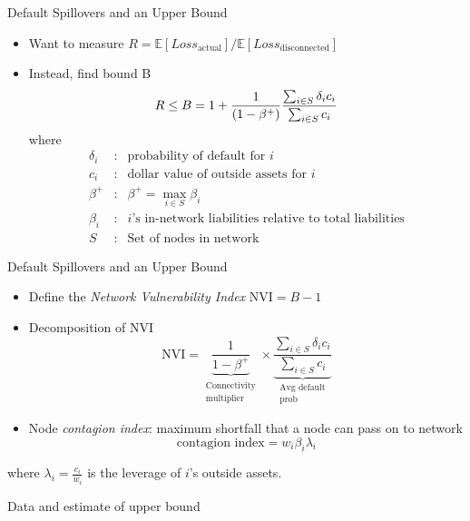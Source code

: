 \documentclass[12pt,envcountsect, leqno,xcolor=dvipsnames]{beamer}
\newcommand{\bi}{\begin{itemize}}
\newcommand{\ei}{\end{itemize}}
\begin{document}
\begin{frame}{Default Spillovers and an Upper Bound} 

\bi
\item Want to measure $R=\mathbb{E}[Loss_{\text{actual}}] / \mathbb{E}[Loss_\text{disconnected}]$
\item Instead, find bound B
	\[
	R \leq B=1+\frac{1}{(1-\beta ^{+})} \frac{\sum_{i \in S} {\delta _{i}c_{i}}}{\sum_{i \in S}{c_{i}}}\vspace{-0.1in}
	\]
where\vspace{-0.1in}
\begin{eqnarray*}
\delta _{i} &:&\text{probability of default for }i\\
c_{i} &:&\text{dollar value of outside assets for }i\\
\beta ^{+} &:& \beta^{+}=\max_{i \in S}\beta _{i} \\
\beta_i &:&i\text{'s in-network liabilities relative to total liabilities}\\
S &:&\text{Set of nodes in network}
\end{eqnarray*}%

\ei

\end{frame}


\begin{frame}{Default Spillovers and an Upper Bound} 

\bi
\item Define the \textit{Network Vulnerability Index} NVI$= B-1$
\item Decomposition of NVI
	\[
	\text{NVI} = \underbrace{\frac{1}{1-\beta ^{+}}}_{\substack{\text{Connectivity}  \\ \text{multiplier}}} \times \underbrace{\frac{\sum_{i \in S} {\delta _{i}c_{i}}}{\sum_{i \in S}{c_{i}}}}_{\substack{\text{Avg default} \\ \text{prob}}}
	\]
\item Node \textit{contagion index}: maximum shortfall that a node can pass on to network
	\[
	\text{contagion index} = w_i \beta_i \lambda_i
	\]
\ei
\hspace{0.35in}where $\lambda_i=\frac{c_i}{w_i}$ is the leverage of $i$'s outside assets. 
\end{frame}

\begin{frame}

{\Large Data and estimate of upper bound}

\end{frame}
\end{document}
